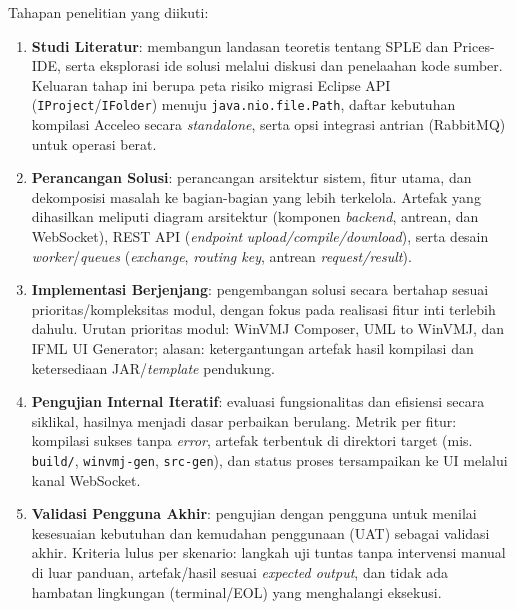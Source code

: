 \documentclass[12pt,a4paper,onecolumn]{article}
\begin{document}
Tahapan penelitian yang diikuti:
\begin{enumerate}[leftmargin=*, label=\arabic*., itemsep=0.5\baselineskip]
    \item \textbf{Studi Literatur}: membangun landasan teoretis tentang SPLE dan Prices-IDE, serta eksplorasi ide solusi melalui diskusi dan penelaahan kode sumber. Keluaran tahap ini berupa peta risiko migrasi Eclipse API (\texttt{IProject}/\texttt{IFolder}) menuju \texttt{java.nio.file.Path}, daftar kebutuhan kompilasi Acceleo secara \textit{standalone}, serta opsi integrasi antrian (RabbitMQ) untuk operasi berat.
    \item \textbf{Perancangan Solusi}: perancangan arsitektur sistem, fitur utama, dan dekomposisi masalah ke bagian-bagian yang lebih terkelola. Artefak yang dihasilkan meliputi diagram arsitektur (komponen \textit{backend}, antrean, dan WebSocket), REST API (\textit{endpoint} \textit{upload/compile/download}), serta desain \textit{worker}/\textit{queues} (\textit{exchange}, \textit{routing key}, antrean \textit{request/result}).
    \item \textbf{Implementasi Berjenjang}: pengembangan solusi secara bertahap sesuai prioritas/kompleksitas modul, dengan fokus pada realisasi fitur inti terlebih dahulu. Urutan prioritas modul: WinVMJ Composer, UML to WinVMJ, dan IFML UI Generator; alasan: ketergantungan artefak hasil kompilasi dan ketersediaan JAR/\textit{template} pendukung.
    \item \textbf{Pengujian Internal Iteratif}: evaluasi fungsionalitas dan efisiensi secara siklikal, hasilnya menjadi dasar perbaikan berulang. Metrik per fitur: kompilasi sukses tanpa \textit{error}, artefak terbentuk di direktori target (mis. \texttt{build/}, \texttt{winvmj-gen}, \texttt{src-gen}), dan status proses tersampaikan ke UI melalui kanal WebSocket.
    \item \textbf{Validasi Pengguna Akhir}: pengujian dengan pengguna untuk menilai kesesuaian kebutuhan dan kemudahan penggunaan (UAT) sebagai validasi akhir. Kriteria lulus per skenario: langkah uji tuntas tanpa intervensi manual di luar panduan, artefak/hasil sesuai \textit{expected output}, dan tidak ada hambatan lingkungan (terminal/EOL) yang menghalangi eksekusi.
\end{enumerate}
\end{document}
